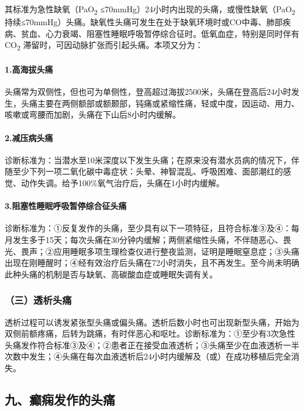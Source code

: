 其标准为急性缺氧（PaO\textsubscript{2}
≤70mmHg）24小时内出现的头痛，或慢性缺氧（PaO\textsubscript{2}
持续≤70mmHg）头痛。缺氧性头痛可发生在处于缺氧环境时或CO中毒、肺部疾病、贫血、心力衰竭、阻塞性睡眠呼吸暂停综合征时。低氧血症，特别是同时伴有CO\textsubscript{2}
滞留时，可因动脉扩张而引起头痛。本项又分为：

\paragraph{1.高海拔头痛}

头痛常为双侧性，但也可为单侧性，登高超过海拔2500米，头痛在登高后24小时发生，头痛主要在两侧额部或额颞部，钝痛或紧缩性痛，轻或中度，因运动、用力、咳嗽或弯腰而加剧，头痛在下山后8小时内缓解。

\paragraph{2.减压病头痛}

诊断标准为：当潜水至10米深度以下发生头痛；在原来没有潜水员病的情况下，伴随至少下列一项二氧化碳中毒症状：头晕、神智混乱、呼吸困难、面部潮红的感觉、动作失调。给予100\%氧气治疗后，头痛在1小时内缓解。

\paragraph{3.阻塞性睡眠呼吸暂停综合征头痛}

诊断标准为：①反复发作的头痛，至少具有以下一项特征，且符合标准③及④：每月发生多于15天；每次头痛在30分钟内缓解；两侧紧缩性头痛，不伴随恶心、畏光、畏声；②应用睡眠多项生理检查仪进行整夜监测，证明是睡眠窒息症；③头痛出现在刚睡醒时；④经有效治疗后头痛在72小时消失，且不再发生。至今尚未明确此种头痛的机制是否与缺氧、高碳酸血症或睡眠失调有关。

\subsubsection{（三）透析头痛}

透析过程可以诱发紧张型头痛或偏头痛。透析后数小时也可出现新型头痛，开始为双侧前额疼痛，后转为跳痛，有时伴恶心和呕吐。诊断标准为：①至少有3次急性头痛发作符合标准③及④；②患者正在接受血液透析；③头痛至少在血液透析一半次数中发生；④头痛在每次血液透析后24小时内缓解及（或）在成功移植后完全消失。

\subsection{九、癫痫发作的头痛}

